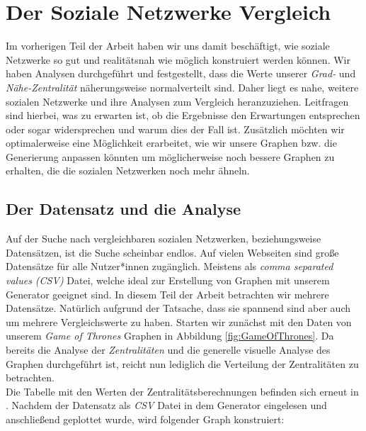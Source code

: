 \chapter{Der Soziale Netzwerke Vergleich}\label{ch:vergleich}

Im vorherigen Teil der Arbeit haben wir uns damit beschäftigt, wie soziale Netzwerke so gut und realitätsnah wie möglich konstruiert werden können. Wir haben Analysen durchgeführt und festgestellt, dass die Werte unserer \textit{Grad-} und \textit{Nähe-Zentralität} näherungsweise normalverteilt sind. Daher liegt es nahe, weitere sozialen Netzwerke und ihre Analysen zum Vergleich heranzuziehen. Leitfragen sind hierbei, was zu erwarten ist, ob die Ergebnisse den Erwartungen entsprechen oder sogar widersprechen und warum dies der Fall ist. Zusätzlich möchten wir optimalerweise eine Möglichkeit erarbeitet, wie wir unsere Graphen bzw. die Generierung anpassen könnten um möglicherweise noch bessere Graphen zu erhalten, die die sozialen Netzwerken noch mehr ähneln. 

\section{Der Datensatz und die Analyse}
Auf der Suche nach vergleichbaren sozialen Netzwerken, beziehungsweise Datensätzen, ist die Suche scheinbar endlos. Auf vielen Webseiten sind große Datensätze für alle Nutzer*innen zugänglich. Meistens als \textit{comma separated values (CSV)} Datei, welche ideal zur Erstellung von Graphen mit unserem Generator geeignet sind. In diesem Teil der Arbeit betrachten wir mehrere Datensätze. Natürlich aufgrund der Tatsache, dass sie spannend sind aber auch um mehrere Vergleichswerte zu haben. Starten wir zunächst mit den Daten \cite{GOT} von unserem \textit{Game of Thrones} Graphen in Abbildung \ref{fig:GameOfThrones}. Da bereits die Analyse der \textit{Zentralitäten} und die generelle visuelle Analyse des Graphen durchgeführt ist, reicht nun lediglich die Verteilung der Zentralitäten zu betrachten.\\
Die Tabelle mit den Werten der Zentralitätsberechnungen befinden sich erneut in \cite{TZ}. Nachdem der Datensatz als \textit{CSV} Datei in dem Generator eingelesen und anschließend geplottet wurde, wird folgender Graph konstruiert:

